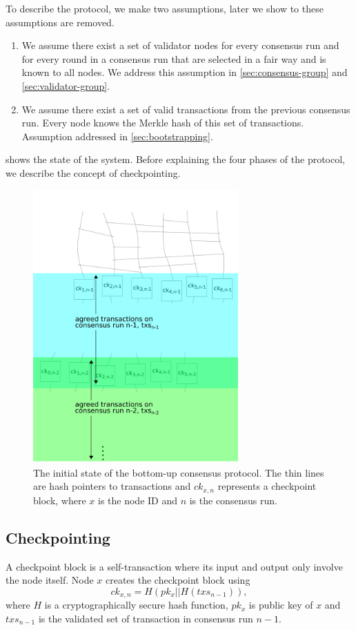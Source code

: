To describe the protocol, we make two assumptions, later we show to these
assumptions are removed.
\begin{enumerate}
\item We assume there exist a set of validator nodes for every consensus run and
  for every round in a consensus run that are selected in a fair way and is
  known to all nodes. We address this assumption in \cref{sec:consensus-group}
  and \cref{sec:validator-group}.
\item We assume there exist a set of valid transactions from the previous
  consensus run. Every node knows the Merkle hash of this set of transactions.
  Assumption addressed in \cref{sec:bootstrapping}.
\end{enumerate}
 shows the state of the system. Before explaining the
four phases of the protocol, we describe the concept of checkpointing.

\begin{figure}[htb]
	\centering
	\includegraphics[width=0.7\textwidth]{figures/protocol-init}
	\caption{The initial state of the bottom-up consensus protocol. The thin
      lines are hash pointers to transactions and $ck_{x,n}$ represents a
      checkpoint block, where $x$ is the node ID and $n$ is the consensus run.}
    \label{fig:protocol-init}
\end{figure}

\subsection{Checkpointing}
A checkpoint block is a self-transaction where its input and output only involve
the node itself. Node $x$ creates the checkpoint block using
$$
ck_{x,n} = H(pk_x || H(txs_{n-1})),
$$
where $H$ is a cryptographically secure hash function, $pk_{x}$ is public key of
$x$ and $txs_{n-1}$ is the validated set of transaction in consensus run
$n-1$.

